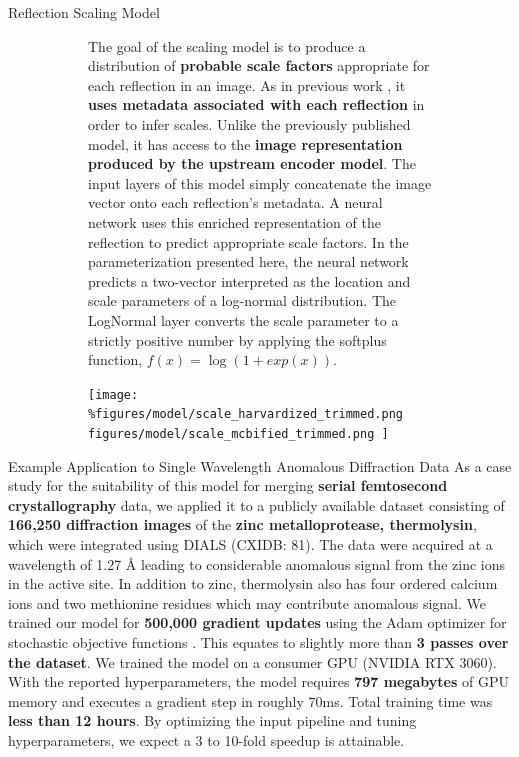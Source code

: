 \documentclass[final]{beamer}
\newlength{\colwidth}
\begin{document}
\begin{frame}[t]
\begin{columns}[t]
\begin{column}{\colwidth}
\begin{block}{Reflection Scaling Model}
\begin{figure}
\begin{subfigure}[c]{0.5\textwidth}
           The goal of the scaling model is to produce a distribution of \textbf{probable scale factors} appropriate for each reflection in an image. As in previous work \cite{dalton_careless_2021}, it \textbf{uses metadata associated with each reflection} in order to infer scales. Unlike the previously published model, it has access to the \textbf{image representation produced by the upstream encoder model}. The input layers of this model simply concatenate the image vector onto each reflection's metadata. A neural network uses this enriched representation of the reflection to predict appropriate scale factors. In the parameterization presented here, the neural network predicts a two-vector interpreted as the location and scale parameters of a log-normal distribution. The LogNormal layer converts the scale parameter to a strictly positive number by applying the softplus function, $f(x) = \log(1 + exp(x))$.
        \end{subfigure}
        \begin{subfigure}[c]{0.45\textwidth}
            \centering
            \texttt{[image: 
                \%figures/model/scale\_harvardized\_trimmed.png
                figures/model/scale\_mcbified\_trimmed.png
            ]}
        \end{subfigure}
    \end{figure}
    
  \end{block}
  \begin{block}{Example Application to Single Wavelength Anomalous Diffraction Data}
  As a case study for the suitability of this model for merging \textbf{serial femtosecond crystallography} data, we applied it to a publicly available dataset consisting of \textbf{166,250 diffraction images} \cite{kern_taking_2014} of the \textbf{zinc metalloprotease, thermolysin}, which were integrated using DIALS \cite{brewster_improving_2018} (CXIDB: 81). The data were acquired at a wavelength of 1.27 Å leading to considerable anomalous signal from the zinc ions in the active site. In addition to zinc, thermolysin also has four ordered calcium ions and two methionine residues which may contribute anomalous signal. We trained our model for \textbf{500,000 gradient updates} using the Adam optimizer for stochastic objective functions \cite{kingma_adam_2017}. This equates to slightly more than \textbf{3 passes over the dataset}. We trained the model on a consumer GPU (NVIDIA RTX 3060). With the reported hyperparameters, the model requires \textbf{797 megabytes} of GPU memory and executes a gradient step in roughly 70ms. Total training time was \textbf{less than 12 hours}. By optimizing the input pipeline and tuning hyperparameters, we expect a 3 to 10-fold speedup is attainable. 


\end{block}
\end{column}
\end{columns}
\end{frame}
\end{document}
